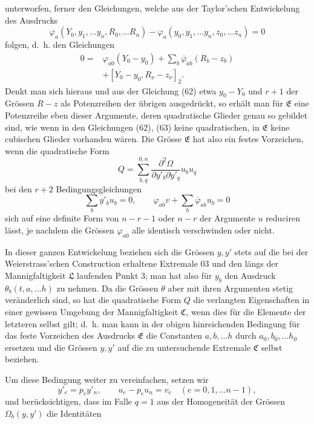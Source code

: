 \documentclass[11pt,a4paper,leqno]{article}
\begin{document}
unterworfen, ferner den Gleichungen, welche aus der Taylor'schen
Entwickelung des Ausdrucks
\[
\varphi_a(Y_0,y_1,\ldots y_n,R_0,\ldots R_n)
-\varphi_a(y_0,y_1,\ldots y_n,z_0,\ldots z_n)=0
\]
folgen, d.~h. den Gleichungen
\begin{equation}\tag{63}
\begin{aligned}
0={}&\varphi_{a0}(Y_0-y_0)+\sum_b\overline{\varphi}_{ab}(R_b-z_b)\\
&+[Y_0-y_0,R_\nu-z_\nu]_2.
\end{aligned}
\end{equation}
Denkt man sich hieraus und aus der Gleichung (62) etwa $y_0-Y_0$ und
$r+1$ der Grössen $R-z$ als Potenzreihen der übrigen ausgedrückt, so
erhält man für $\mathfrak{E}$ eine Potenzreihe eben dieser Argumente,
deren quadratische Glieder genau so gebildet sind, wie wenn in den
Gleichungen (62), (63) keine quadratischen, in $\mathfrak{E}$ keine
cubischen Glieder vorhanden wären. Die Grösse $\mathfrak{E}$ hat also
ein festes Vorzeichen, wenn die quadratische Form
\[
Q=\sum_{b,q}^{0,n}
\frac{\partial^2\Omega}{\partial y'_b\partial y'_q}u_bu_q
\]
bei den $r+2$ Bedingungsgleichungen
\begin{equation}\tag{64}
\sum_b y'_b u_b=0,\qquad
\varphi_{a0}v+\sum_b\overline{\varphi}_{ab}u_b=0
\end{equation}
sich auf eine definite Form von $n-r-1$ oder $n-r$ der Argumente $u$
reduciren lässt, je nachdem die Grössen $\varphi_{a0}$ alle identisch
verschwinden oder nicht.

In dieser ganzen Entwickelung beziehen sich die Grössen $y,y'$ stets
auf die bei der Weierstrass'schen Construction erhaltene Extremale 03
und den längs der Mannigfaltigkeit $\mathfrak{L}$ laufenden Punkt 3;
man hat also für $y_b$ den Ausdruck $\theta_b(t,a,\ldots h)$ zu nehmen.
Da die Grössen $\theta$ aber mit ihren Argumenten stetig veränderlich
sind, so hat die quadratische Form $Q$ die verlangten Eigenschaften in
einer gewissen Umgebung der Mannigfaltigkeit $\mathfrak{C}$, wenn dies
für die Elemente der letzteren selbst gilt; d.~h. man kann in der
obigen hinreichenden Bedingung für das feste Vorzeichen des Ausdrucks
$\mathfrak{E}$ die Constanten $a,b,\ldots h$ durch $a_0,b_0,\ldots h_0$
ersetzen und die Grössen $y,y'$ auf die zu untersuchende Extremale
$\mathfrak{C}$ selbst beziehen.

Um diese Bedingung weiter zu vereinfachen, setzen wir
\[
y'_e=p_e y'_n,\qquad u_e-p_eu_n=v_e
\quad(e=0,1,\ldots n-1),
\]
und berücksichtigen, dass im Falle $q=1$ aus der Homogeneität der
Grössen $\Omega_b(y,y')$ die Identitäten
\end{document}
